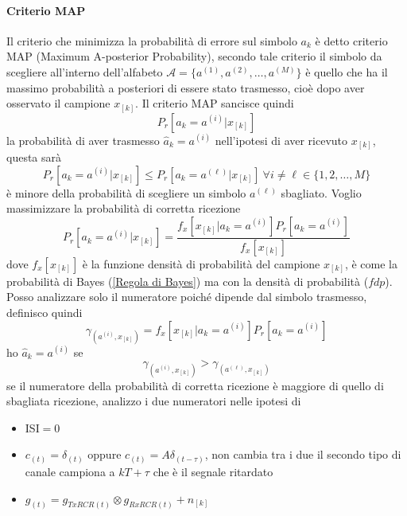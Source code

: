         \paragraph{Criterio MAP}
            Il criterio che minimizza la probabilità di errore sul simbolo $a_k$ è detto criterio MAP (Maximum A-posterior Probability),
            secondo tale criterio il simbolo da scegliere all'interno dell'alfabeto $\mathcal{A} = \{a^{(1)},a^{(2)},\dots,a^{(M)}\}$
            è quello che ha il massimo probabilità a posteriori di essere stato trasmesso, cioè dopo aver osservato il campione $x_{[k]}$.
            Il criterio MAP sancisce quindi 
            \[
                P_r[a_k = a^{(i)}|x_{[k]}]    
            \]
            la probabilità di aver trasmesso $\hat{a}_{k}=a^{(i)}$ nell'ipotesi di aver ricevuto $x_{[k]}$, questa sarà
            \[
                P_r[a_k = a^{(i)}|x_{[k]}] \leq P_r[a_k = a^{(\ell)}|x_{[k]}]\ \forall i\neq \ell\in \{1,2,\dots,M\}    
            \]
            è minore della probabilità di scegliere un simbolo $a^{(\ell)}$ sbagliato. Voglio massimizzare la probabilità di 
            corretta ricezione 
            \[
                P_r[a_k = a^{(i)}|x_{[k]}] = \frac{f_x[x_{[k]}|a_k = a^{(i)}]P_r[a_k = a^{(i)}]}{f_x[x_{[k]}]}    
            \]
            dove $f_x[x_{[k]}]$ è la funzione densità di probabilità del campione $x_{[k]}$,
            è come la probabilità di Bayes (\ref{Regola di Bayes}) ma con la densità di probabilità ($fdp$). Posso analizzare
            solo il numeratore poiché dipende dal simbolo trasmesso, definisco quindi 
            \[
                \gamma_{(a^{(i)},x_{[k]})} = f_x[x_{[k]}|a_k = a^{(i)}]P_r[a_k = a^{(i)}]
            \] 
            ho $\hat{a}_k = a^{(i)}$ se 
            \[
                \gamma_{(a^{(i)},x_{[k]})} > \gamma_{(a^{(\ell)},x_{[k]})}
            \]
            se il numeratore della probabilità di corretta ricezione è maggiore di quello di sbagliata ricezione, 
            analizzo i due numeratori nelle ipotesi di 
            \begin{itemize}
                \item {ISI$=0$}
                \item {$c_{(t)} = \delta_{(t)}$ oppure $c_{(t)} = A\delta_{(t-\tau)}$, non cambia tra i due il secondo tipo di canale campiona a $kT+\tau$
                    che è il segnale ritardato}
                \item {$g_{(t)} = g_{TxRCR(t)}\otimes g_{RxRCR(t)} + n_{[k]}$}
            \end{itemize}
